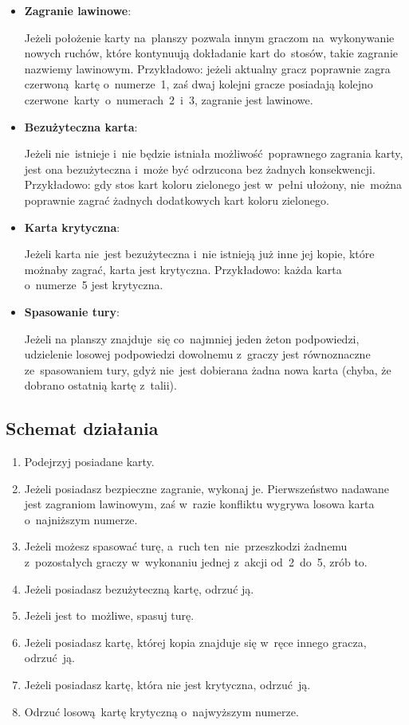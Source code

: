 \documentclass[declaration,shortabstract,inz]{iithesis}
\begin{document}
\begin{itemize}
	\item \textbf{Zagranie lawinowe}:
	
	Jeżeli położenie karty na~planszy pozwala innym graczom na~wykonywanie nowych ruchów, które kontynuują dokładanie kart do~stosów, takie zagranie nazwiemy lawinowym. Przykładowo: jeżeli aktualny gracz poprawnie zagra czerwoną kartę o~numerze~1, zaś dwaj kolejni gracze posiadają kolejno czerwone~karty o~numerach~2~i~3, zagranie jest lawinowe.
	
	\item \textbf{Bezużyteczna karta}:
	
	Jeżeli nie~istnieje i~nie będzie istniała możliwość poprawnego zagrania karty, jest ona bezużyteczna i~może być odrzucona bez żadnych konsekwencji. Przykładowo: gdy stos kart koloru zielonego jest w~pełni ułożony, nie~można poprawnie zagrać żadnych dodatkowych kart koloru zielonego.
	
	\item \textbf{Karta krytyczna}:
	
	Jeżeli karta nie~jest bezużyteczna i~nie istnieją już inne jej kopie, które możnaby zagrać, karta jest krytyczna. Przykładowo: każda karta o~numerze~5 jest krytyczna.
	
	\item \textbf{Spasowanie tury}:
	
	Jeżeli na planszy znajduje~się co~najmniej jeden żeton podpowiedzi, udzielenie losowej podpowiedzi dowolnemu z~graczy jest równoznaczne ze~spasowaniem tury, gdyż nie~jest dobierana żadna nowa karta (chyba, że dobrano ostatnią kartę z~talii).
\end{itemize}

\subsection*{Schemat działania}

\begin{enumerate}
	\item Podejrzyj posiadane karty.
	\item Jeżeli posiadasz bezpieczne zagranie, wykonaj je. Pierwszeństwo nadawane jest zagraniom lawinowym, zaś w~razie konfliktu wygrywa losowa karta o~najniższym numerze.
	\item Jeżeli możesz spasować turę, a~ruch ten~nie~przeszkodzi żadnemu z~pozostałych graczy w~wykonaniu jednej z~akcji od~2~do~5, zrób to.
	\item Jeżeli posiadasz bezużyteczną kartę, odrzuć ją.
	\item Jeżeli jest to~możliwe, spasuj turę.
	\item Jeżeli posiadasz kartę, której kopia znajduje się w~ręce innego gracza, odrzuć ją.
	\item Jeżeli posiadasz kartę, która nie jest krytyczna, odrzuć ją.
	\item Odrzuć losową kartę krytyczną o~najwyższym numerze.
\end{enumerate}
\end{document}
